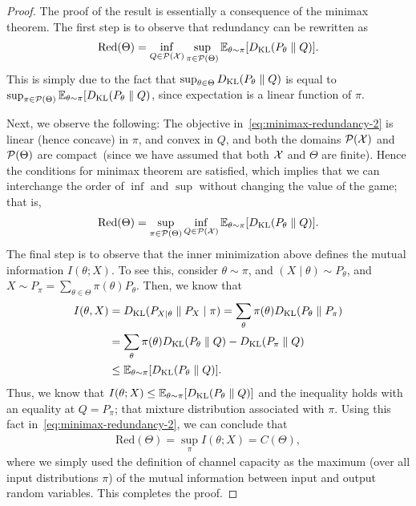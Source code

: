 \documentclass[12pt]{article}
\begin{document}
\begin{proof}
    The proof of the result is essentially a consequence of the minimax theorem. The first step is to observe that redundancy can be rewritten as 
    \begin{align}
        \mathrm{Red}(\Theta) = \inf_{Q \in {\cal P}({\cal X})} \sup_{\pi \in {\cal P}(\Theta)} \mathbb{E}_{\theta \sim \pi}[D_{\text{KL}}(P_\theta \parallel Q)]. \label{eq:minimax-redundancy-2}
    \end{align}
    This is simply due to the fact that $\sup_{\theta \in \Theta} D_{\text{KL}}(P_\theta \parallel Q)$ is equal to $\sup_{\pi \in {\cal P}(\Theta)} \mathbb{E}_{\theta \sim \pi}[D_{\text{KL}}(P_\theta \parallel Q)$, since expectation is a linear function of $\pi$. 

    Next, we observe the following: The objective in~\eqref{eq:minimax-redundancy-2} is linear (hence concave) in $\pi$, and convex in $Q$, and both the domains ${\cal P}({\cal X})$ and ${\cal P}(\Theta)$ are compact~(since we have assumed that both ${\cal X}$ and $\Theta$ are finite). Hence the conditions for minimax theorem are satisfied, which implies that we can interchange the order of $\inf$ and $\sup$ without changing the value of the game; that is,
    \begin{align}
        \mathrm{Red}(\Theta) = \sup_{\pi \in {\cal P}(\Theta)} \inf_{Q \in {\cal P}({\cal X})} \mathbb{E}_{\theta \sim \pi}[D_{\text{KL}}(P_\theta \parallel Q)]. 
    \end{align}
    The final step is to observe that the inner minimization above defines the mutual information $I(\theta; X)$. 
    To see this, consider $\theta \sim \pi$, and $(X\mid \theta) \sim P_\theta$, and $X \sim P_\pi = \sum_{\theta \in \Theta} \pi(\theta) P_\theta$. Then, we know that 
    \begin{align}
        I(\theta, X) &= D_{\text{KL}}(P_{X\mid \theta} \parallel P_X \mid \pi) = \sum_{\theta} \pi(\theta) D_{\text{KL}}(P_\theta \parallel P_\pi) \\
        & = \sum_{\theta} \pi(\theta) D_{\text{KL}}(P_\theta \parallel Q) - D_{\text{KL}}( P_\pi \parallel Q) \\
        & \leq \mathbb{E}_{\theta \sim \pi}[D_{\text{KL}}(P_\theta \parallel Q)]. 
    \end{align}
    Thus, we know that $I(\theta; X) \leq \mathbb{E}_{\theta\sim \pi}[D_{\text{KL}}(P_\theta \parallel Q)]$ and the inequality holds with an equality at $Q = P_\pi$; that mixture distribution associated with $\pi$. Using this fact in~\eqref{eq:minimax-redundancy-2}, we can conclude that 
    \begin{align}
        \mathrm{Red}(\Theta) = \sup_{\pi} I(\theta; X) = C(\Theta), 
    \end{align}
    where we simply used the definition of channel capacity as the maximum (over all input distributions $\pi$) of the mutual information between input and output random variables. This completes the proof. 
\end{proof}
\end{document}
